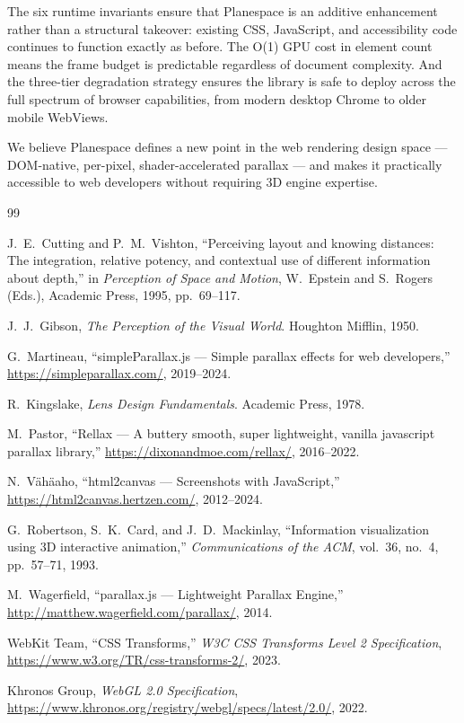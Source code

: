 \documentclass[10pt,twocolumn]{article}
\begin{document}
The six runtime invariants ensure that Planespace is an additive enhancement
rather than a structural takeover: existing CSS, JavaScript, and accessibility
code continues to function exactly as before. The O(1) GPU cost in element
count means the frame budget is predictable regardless of document complexity.
And the three-tier degradation strategy ensures the library is safe to deploy
across the full spectrum of browser capabilities, from modern desktop Chrome
to older mobile WebViews.

We believe Planespace defines a new point in the web rendering design space ---
DOM-native, per-pixel, shader-accelerated parallax --- and makes it
practically accessible to web developers without requiring 3D engine expertise.


\begin{thebibliography}{99}

J.~E.~Cutting and P.~M.~Vishton,
``Perceiving layout and knowing distances: The integration, relative potency,
and contextual use of different information about depth,''
in \textit{Perception of Space and Motion}, W.~Epstein and S.~Rogers (Eds.),
Academic Press, 1995, pp.~69--117.

J.~J.~Gibson,
\textit{The Perception of the Visual World}.
Houghton Mifflin, 1950.

G.~Martineau,
``simpleParallax.js --- Simple parallax effects for web developers,''
\url{https://simpleparallax.com/}, 2019--2024.

R.~Kingslake,
\textit{Lens Design Fundamentals}.
Academic Press, 1978.

M.~Pastor,
``Rellax — A buttery smooth, super lightweight, vanilla javascript parallax library,''
\url{https://dixonandmoe.com/rellax/}, 2016--2022.

N.~Vähäaho,
``html2canvas --- Screenshots with JavaScript,''
\url{https://html2canvas.hertzen.com/}, 2012--2024.

G.~Robertson, S.~K.~Card, and J.~D.~Mackinlay,
``Information visualization using 3D interactive animation,''
\textit{Communications of the ACM}, vol.~36, no.~4, pp.~57--71, 1993.

M.~Wagerfield,
``parallax.js --- Lightweight Parallax Engine,''
\url{http://matthew.wagerfield.com/parallax/}, 2014.

WebKit Team,
``CSS Transforms,''
\textit{W3C CSS Transforms Level 2 Specification},
\url{https://www.w3.org/TR/css-transforms-2/}, 2023.

{Khronos Group},
\textit{WebGL 2.0 Specification},
\url{https://www.khronos.org/registry/webgl/specs/latest/2.0/}, 2022.

\end{thebibliography}
\end{document}
